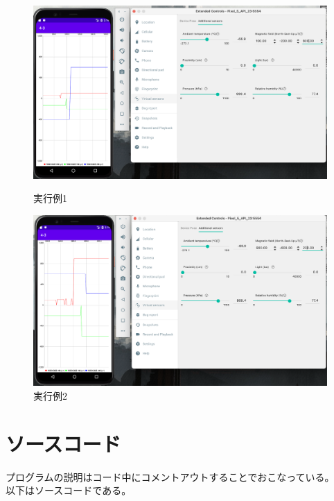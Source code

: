 \documentclass[dvipdfmx,autodetect-engine,titlepage]{jsarticle}
\begin{document}
\begin{figure}[h]
  \begin{minipage}[b]{0.45\linewidth}
  \begin{center}
    \includegraphics[keepaspectratio,scale=0.15]{pic2.png}
    \end{center}
    \caption{実行例1}
  \end{minipage}
  \begin{minipage}[b]{0.45\linewidth}
  \begin{center}
    \includegraphics[keepaspectratio,scale=0.15]{pic3.png}
    \end{center}
    \caption{実行例2}
  \end{minipage}
\end{figure}


\section{ソースコード}

プログラムの説明はコード中にコメントアウトすることでおこなっている。\\
以下はソースコードである。
\end{document}
